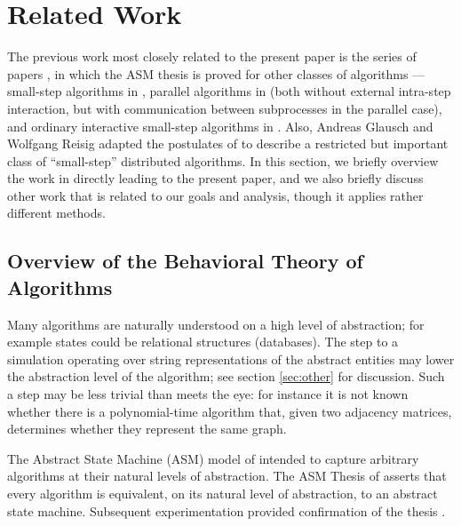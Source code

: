 \documentclass{LMCS}
\theoremstyle{definition}
\begin{document}
\section{Related Work}

The previous work most closely related to the present paper is the
series of papers \cite{seqth, parth, oa1, oa2, oa3}, in which the ASM
thesis is proved for other classes of algorithms --- small-step
algorithms in \cite{seqth}, parallel algorithms in \cite{parth} (both
without external intra-step interaction, but with communication between
subprocesses in the parallel case), and ordinary interactive
small-step algorithms in \cite{oa1, oa2, oa3}.
  Also, Andreas Glausch and Wolfgang Reisig \cite{glausch, gl-re}
  adapted the postulates of \cite{seqth} to describe a restricted but
  important class of ``small-step'' distributed algorithms.
In this section, we briefly overview the work in \cite{seqth, oa1,
oa2, oa3} directly leading to the present paper, and we also briefly
discuss other work that is related to our goals and analysis, though
it applies rather different methods.

\subsection{Overview of the Behavioral Theory of Algorithms}
\label{sec:overview}

Many algorithms are naturally understood on a high level of abstraction;
for example states could be relational structures (databases).  The step
to a simulation operating over string representations of the abstract
entities may lower the abstraction level of the algorithm; see section
\ref{sec:other} for discussion.  Such a step may be less trivial than
meets the eye: for instance it is not known whether there is a
polynomial-time algorithm that, given two adjacency matrices, determines
whether they represent the same graph.

The Abstract State Machine (ASM) model of \cite{lipari} intended to
capture arbitrary algorithms at their natural levels of abstraction.  The
ASM Thesis of \cite{lipari} asserts that every algorithm is equivalent, on
its natural level of abstraction, to an abstract state machine.
Subsequent experimentation provided confirmation of the thesis
\cite{ASM,AsmL,BS}.
\end{document}
